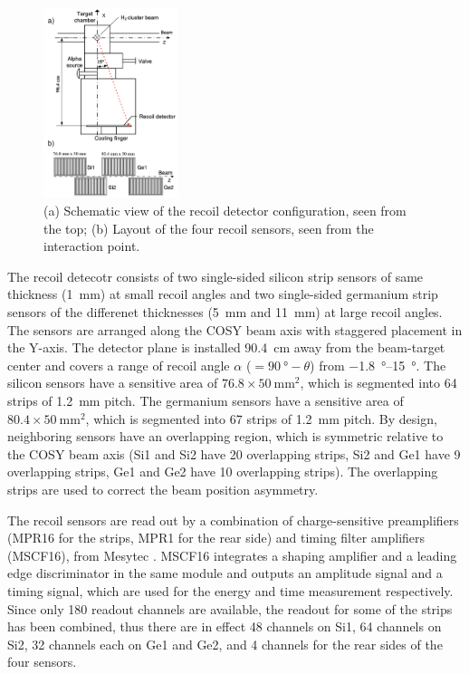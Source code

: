 \documentclass[number,5p]{elsarticle}
\begin{document}
\begin{figure}[htbp]
  \centering
  \includegraphics[width=0.35\textwidth]{./recoil_schematic.png}
  \caption{(a) Schematic view of the recoil detector configuration, seen from the
    top; (b) Layout of the four recoil sensors, seen from the interaction point.}
  \label{fig:recoil_schematic}
\end{figure}
The recoil detecotr consists of two single-sided silicon strip sensors of same
thickness (\SI{1}{\mm}) at small recoil angles and two single-sided germanium
strip sensors of the differenet thicknesses (\SI{5}{\mm} and \SI{11}{\mm}) at large recoil angles.
The sensors are arranged along the COSY beam axis with staggered placement in the Y-axis.
The detector plane is installed \SI{90.4}{\cm} away from the beam-target center
and covers a range of recoil angle $\alpha$ ($=\SI{90}{\degree}-\theta$) from \SIrange[range-units=repeat]{-1.8}{15}{\degree}.
The silicon sensors have a sensitive area of $76.8 \times \SI{50}{\mm\squared}$, which is
segmented into 64 strips of \SI{1.2}{\mm} pitch.
The germanium sensors have a sensitive area of \(80.4 \times \SI{50}{\mm\squared}\), which is segmented into 67 strips of \SI{1.2}{\mm} pitch.
By design, neighboring sensors have an overlapping region, which is symmetric
relative to the COSY beam axis (Si1 and Si2 have 20 overlapping strips, Si2 and Ge1
have 9 overlapping strips, Ge1 and Ge2 have 10 overlapping strips).
The overlapping strips are used to correct the beam position asymmetry.

The recoil sensors are read out by a combination of charge-sensitive preamplifiers (MPR16 for the strips, MPR1 for the rear side) and timing filter amplifiers (MSCF16), from Mesytec \cite{mesytec}. 
MSCF16 integrates a shaping amplifier and a leading edge discriminator in the
same module and outputs an amplitude signal and a timing signal, which are used
for the energy and time measurement respectively.
Since only 180 readout channels are available, the readout for some of the
strips has been combined, thus there are in effect 48 channels on Si1, 64
channels on Si2, 32 channels each on Ge1 and Ge2, and 4 channels for the rear sides
of the four sensors. 
\end{document}
